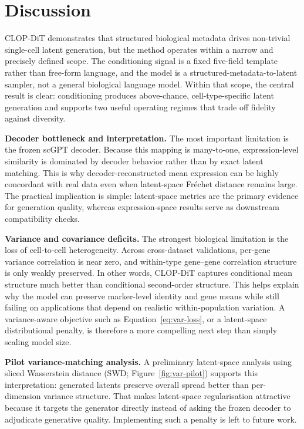 \documentclass[biology,article,submit,pdftex,moreauthors]{Definitions/mdpi}
\begin{document}
\section{Discussion}\label{sec:discussion}

 CLOP-DiT demonstrates that structured biological metadata drives non-trivial single-cell latent generation, but the method operates within a narrow and precisely defined scope. The conditioning signal is a fixed five-field template rather than free-form language, and the model is a structured-metadata-to-latent sampler, not a general biological language model. Within that scope, the central result is clear: conditioning produces above-chance, cell-type-specific latent generation and supports two useful operating regimes that trade off fidelity against diversity.

\textbf{Decoder bottleneck and interpretation.} The most important limitation is the frozen scGPT decoder. Because this mapping is many-to-one, expression-level similarity is dominated by decoder behavior rather than by exact latent matching. This is why decoder-reconstructed mean expression can be highly concordant with real data even when latent-space Fr\'{e}chet distance remains large. The practical implication is simple: latent-space metrics are the primary evidence for generation quality, whereas expression-space results serve as downstream compatibility checks.

\textbf{Variance and covariance deficits.} The strongest biological limitation is the loss of cell-to-cell heterogeneity. Across cross-dataset validations, per-gene variance correlation is near zero, and within-type gene--gene correlation structure is only weakly preserved. In other words, CLOP-DiT captures conditional mean structure much better than conditional second-order structure. This helps explain why the model can preserve marker-level identity and gene means while still failing on applications that depend on realistic within-population variation. A variance-aware objective such as Equation~\ref{eq:var-loss}, or a latent-space distributional penalty, is therefore a more compelling next step than simply scaling model size.

\textbf{Pilot variance-matching analysis.} A preliminary latent-space analysis using sliced Wasserstein distance (SWD; Figure~\ref{fig:var-pilot}) supports this interpretation: generated latents preserve overall spread better than per-dimension variance structure. That makes latent-space regularisation attractive because it targets the generator directly instead of asking the frozen decoder to adjudicate generative quality. Implementing such a penalty is left to future work.
\end{document}

